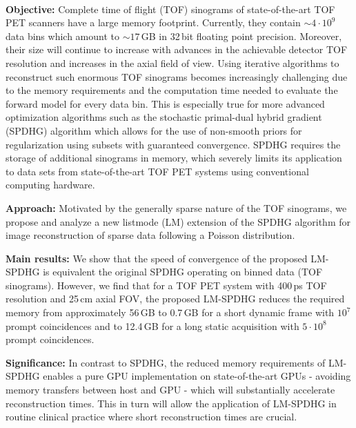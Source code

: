 \\ \textbf{Objective:} 
Complete time of flight (TOF) sinograms of state-of-the-art TOF PET scanners have a large memory 
footprint.
Currently, they contain ${\sim}4{\cdot}10^9$ data bins which amount to ${\sim}17$\,GB 
in 32\,bit floating point precision.
Moreover, their size will continue to increase with advances in the 
achievable detector TOF resolution and increases in the axial field of view.
Using iterative algorithms to reconstruct such enormous TOF sinograms becomes increasingly
challenging due to the memory requirements and the computation time needed to evaluate the
forward model for every data bin.
This is especially true for more advanced optimization algorithms such as the
stochastic primal-dual hybrid gradient (SPDHG) algorithm which allows for the use of non-smooth priors
for regularization using subsets with guaranteed convergence.
SPDHG requires the storage of additional sinograms in memory, which severely limits
its application to data sets from state-of-the-art TOF PET systems using conventional
computing hardware.

\textbf{Approach:}
Motivated by the generally sparse nature of the TOF sinograms, we propose and analyze a new 
listmode (LM) extension of the SPDHG algorithm  for image reconstruction of sparse data 
following a Poisson distribution.

\textbf{Main results:}
We show that the speed of convergence of the proposed 
LM-SPDHG is equivalent the original SPDHG operating on binned data (TOF sinograms).
However, we find that for a TOF PET system with 400\,ps TOF resolution and 25\,cm axial FOV,
the proposed LM-SPDHG reduces the required memory from approximately 56\,GB to
0.7\,GB for a short dynamic frame with $10^7$ prompt coincidences and to 12.4\,GB for a long 
static acquisition with $5\cdot10^8$ prompt coincidences.

\textbf{Significance:}
In contrast to SPDHG, the reduced memory requirements of LM-SPDHG enables 
a pure GPU implementation on state-of-the-art GPUs - avoiding memory transfers
between host and GPU - which will substantially accelerate reconstruction times.
This in turn will allow the application of LM-SPDHG in routine clinical practice where short
reconstruction times are crucial.

